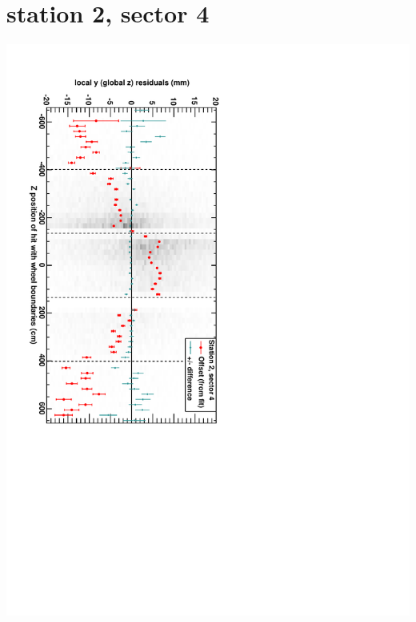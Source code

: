 \documentclass[compress]{beamer}
\begin{document}
\section*{station 2, sector 4}
\begin{frame} \vfill \mbox{\hspace{-1 cm}\includegraphics[height=1.2\linewidth, angle=90]{DTzVsZ_st2_sr04.pdf}} \end{frame}
\end{document}
